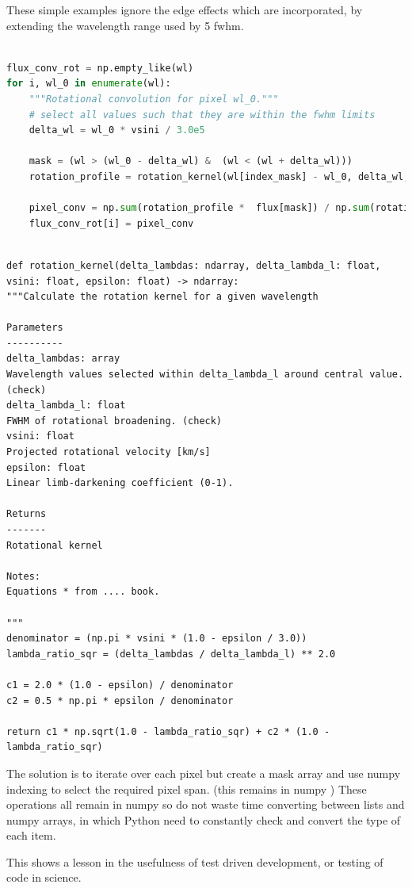 These simple examples ignore the edge effects which are incorporated, by extending the wavelength range used by 5 fwhm.
\begin{lstlisting}[language=Python, caption=Python example]

flux_conv_rot = np.empty_like(wl)
for i, wl_0 in enumerate(wl):
    """Rotational convolution for pixel wl_0."""
    # select all values such that they are within the fwhm limits
    delta_wl = wl_0 * vsini / 3.0e5

    mask = (wl > (wl_0 - delta_wl) &  (wl < (wl + delta_wl)))
    rotation_profile = rotation_kernel(wl[index_mask] - wl_0, delta_wl, vsini, epsilon)
    
    pixel_conv = np.sum(rotation_profile *  flux[mask]) / np.sum(rotation_profile)
    flux_conv_rot[i] = pixel_conv

\end{lstlisting}


\begin{lstlisting}

def rotation_kernel(delta_lambdas: ndarray, delta_lambda_l: float, vsini: float, epsilon: float) -> ndarray:
"""Calculate the rotation kernel for a given wavelength

Parameters
----------
delta_lambdas: array
Wavelength values selected within delta_lambda_l around central value. (check)
delta_lambda_l: float
FWHM of rotational broadening. (check)
vsini: float
Projected rotational velocity [km/s]
epsilon: float
Linear limb-darkening coefficient (0-1).

Returns
-------
Rotational kernel

Notes:
Equations * from .... book.

"""
denominator = (np.pi * vsini * (1.0 - epsilon / 3.0))
lambda_ratio_sqr = (delta_lambdas / delta_lambda_l) ** 2.0

c1 = 2.0 * (1.0 - epsilon) / denominator
c2 = 0.5 * np.pi * epsilon / denominator

return c1 * np.sqrt(1.0 - lambda_ratio_sqr) + c2 * (1.0 - lambda_ratio_sqr)
\end{lstlisting}

The solution is to iterate over each pixel but create a mask array and use numpy indexing to select the required pixel span. (this remains in numpy ) 
These operations all remain in numpy so do not waste time converting between lists and numpy arrays, in which Python need to constantly check and convert the type of each item.

This shows a lesson in the usefulness of test driven development, or testing of code in science.


